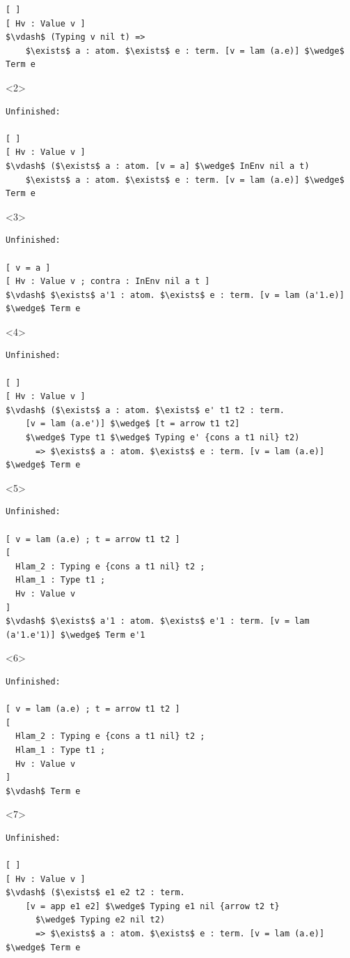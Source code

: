 \documentclass[aspectratio=169]{beamer}
\begin{document}
\begin{frame}[fragile]
\begin{overlayarea}{\linewidth}{2cm}
\begin{onlyenv}
\begin{lstlisting}[mathescape]
[ ]
[ Hv : Value v ]
$\vdash$ (Typing v nil t) =>
    $\exists$ a : atom. $\exists$ e : term. [v = lam (a.e)] $\wedge$ Term e
\end{lstlisting}
\end{onlyenv}
  \begin{onlyenv}<2>
  \begin{lstlisting}[mathescape]
Unfinished:

[ ]
[ Hv : Value v ]
$\vdash$ ($\exists$ a : atom. [v = a] $\wedge$ InEnv nil a t)
    $\exists$ a : atom. $\exists$ e : term. [v = lam (a.e)] $\wedge$ Term e
\end{lstlisting}
\end{onlyenv}
  \begin{onlyenv}<3>
  \begin{lstlisting}[mathescape]
Unfinished:

[ v = a ]
[ Hv : Value v ; contra : InEnv nil a t ]
$\vdash$ $\exists$ a'1 : atom. $\exists$ e : term. [v = lam (a'1.e)] $\wedge$ Term e
\end{lstlisting}
\end{onlyenv}
  \begin{onlyenv}<4>
  \begin{lstlisting}[mathescape]
Unfinished:

[ ]
[ Hv : Value v ]
$\vdash$ ($\exists$ a : atom. $\exists$ e' t1 t2 : term.
    [v = lam (a.e')] $\wedge$ [t = arrow t1 t2]
    $\wedge$ Type t1 $\wedge$ Typing e' {cons a t1 nil} t2)
      => $\exists$ a : atom. $\exists$ e : term. [v = lam (a.e)] $\wedge$ Term e
\end{lstlisting}
\end{onlyenv}
  \begin{onlyenv}<5>
  \begin{lstlisting}[mathescape]
Unfinished:

[ v = lam (a.e) ; t = arrow t1 t2 ]
[
  Hlam_2 : Typing e {cons a t1 nil} t2 ;
  Hlam_1 : Type t1 ;
  Hv : Value v
]
$\vdash$ $\exists$ a'1 : atom. $\exists$ e'1 : term. [v = lam (a'1.e'1)] $\wedge$ Term e'1
\end{lstlisting}
\end{onlyenv}
  \begin{onlyenv}<6>
  \begin{lstlisting}[mathescape]
Unfinished:

[ v = lam (a.e) ; t = arrow t1 t2 ]
[
  Hlam_2 : Typing e {cons a t1 nil} t2 ;
  Hlam_1 : Type t1 ;
  Hv : Value v
]
$\vdash$ Term e
\end{lstlisting}
\end{onlyenv}
  \begin{onlyenv}<7>
  \begin{lstlisting}[mathescape]
Unfinished:

[ ]
[ Hv : Value v ]
$\vdash$ ($\exists$ e1 e2 t2 : term.
    [v = app e1 e2] $\wedge$ Typing e1 nil {arrow t2 t}
      $\wedge$ Typing e2 nil t2)
      => $\exists$ a : atom. $\exists$ e : term. [v = lam (a.e)] $\wedge$ Term e
\end{lstlisting}
\end{onlyenv}
\end{overlayarea}
\end{frame}
\end{document}
